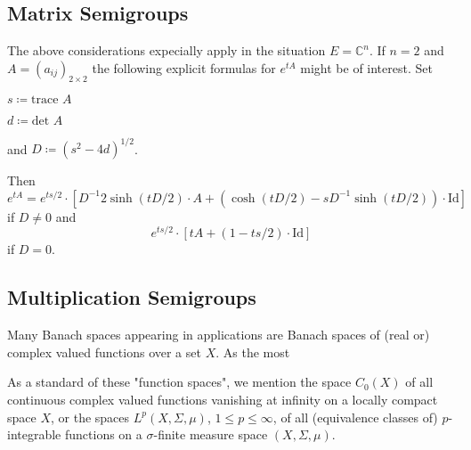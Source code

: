 \subsection{Matrix Semigroups}\label{subsec:a1-2.2}
The above considerations expecially apply in the situation $E = \mathbb{C}^{n}$.
If $n = 2$ and $A = (a_{ij})_{2 \times 2}$ the following explicit formulas for $e^{tA}$ might be of interest.
Set
\begin{enumerate*}[(i)]
\item
$s \coloneqq \text{trace } A$

\item
$d \coloneqq \text{det } A$

\item
and $D \coloneqq (s^{2} - 4d)^{1/2}$.
\end{enumerate*}
Then
\[
    e^{tA} = 
        e^{ts/2} \cdot [D^{-1}2\sinh(tD/2) \cdot A + (\cosh(tD/2) - sD^{-1}\sinh(tD/2)) \cdot \text{Id}] 
\]
if  $D \neq 0$ and
\[
	e^{ts/2} \cdot [tA + (1 - ts/2) \cdot \text{Id}] 
\]
if $D=0$.
\subsection{Multiplication Semigroups}\label{subsec:a1-2.3}

Many Banach spaces appearing in applications are Banach spaces of (real or) complex valued functions over a set $X$.
As the most



\newpage

As a standard of these "function spaces", we mention the space $C_{0}(X)$ of all continuous complex valued functions vanishing at infinity on a locally compact space $X$, or the spaces $L^{p}(X,\Sigma,\mu)$, $1 \leq p \leq \infty$, of all (equivalence classes of) $p$-integrable functions on a $\sigma$-finite measure space $(X,\Sigma,\mu)$.

